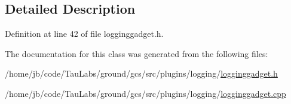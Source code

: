\subsection{\-Detailed \-Description}


\-Definition at line 42 of file logginggadget.\-h.



\-The documentation for this class was generated from the following files\-:\begin{DoxyCompactItemize}
\item 
/home/jb/code/\-Tau\-Labs/ground/gcs/src/plugins/logging/\hyperlink{logginggadget_8h}{logginggadget.\-h}\item 
/home/jb/code/\-Tau\-Labs/ground/gcs/src/plugins/logging/\hyperlink{logginggadget_8cpp}{logginggadget.\-cpp}\end{DoxyCompactItemize}

